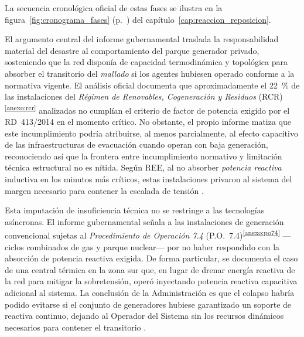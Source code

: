 La secuencia cronológica oficial de estas fases se ilustra en la
figura~\ref{fig:cronograma_fases}
(p.~\pageref{fig:cronograma_fases}) del
capítulo~\ref{cap:reaccion_reposicion}.

El argumento central del informe gubernamental traslada la responsabilidad
material del desastre al comportamiento del parque generador privado,
sosteniendo que la red disponía de capacidad termodinámica y topológica
para absorber el transitorio del \textit{mallado} si los agentes hubiesen
operado conforme a la normativa vigente. El análisis oficial documenta
que aproximadamente el 22~\% de las instalaciones del \textit{Régimen
de Renovables, Cogeneración y Residuos}
(RCR)\textsuperscript{\ref{anexo:rcr}} analizadas no cumplían el criterio
de factor de potencia exigido por el RD~413/2014 en el momento crítico.
No obstante, el propio informe matiza que este incumplimiento podría
atribuirse, al menos parcialmente, al efecto capacitivo de las
infraestructuras de evacuación cuando operan con baja generación,
reconociendo así que la frontera entre incumplimiento normativo y
limitación técnica estructural no es nítida. Según REE, al no absorber
\textit{potencia reactiva} inductiva en los minutos más críticos, estas
instalaciones privaron al sistema del margen necesario para contener la
escalada de tensión \cite{gobierno2025,ree2025}.

Esta imputación de insuficiencia técnica no se restringe a las tecnologías
asíncronas. El informe gubernamental señala a las instalaciones de
generación convencional sujetas al \textit{Procedimiento de Operación
7.4} (P.O.~7.4)\textsuperscript{\ref{anexo:po74}} ---ciclos combinados de
gas y parque nuclear--- por no haber respondido con la absorción de
potencia reactiva exigida. De forma particular, se documenta el caso de
una central térmica en la zona sur que, en lugar de drenar energía
reactiva de la red para mitigar la sobretensión, operó inyectando
potencia reactiva capacitiva adicional al sistema. La conclusión de la
Administración es que el colapso habría podido evitarse si el conjunto
de generadores hubiese garantizado un soporte de reactiva continuo,
dejando al Operador del Sistema sin los recursos dinámicos necesarios
para contener el transitorio \cite{gobierno2025,ree2025}.

